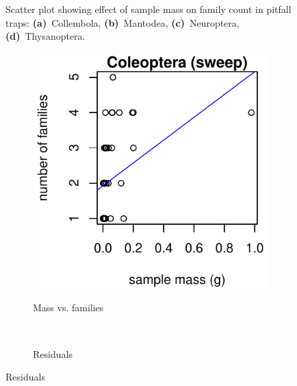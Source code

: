 \documentclass[10pt,letterpaper,twocolumn]{article}
\begin{document}
\begin{figure}[h]
\begin{subfigure}[b]{0.15\textwidth}
		\label{fig:pitfall_thysanoptera_scatter}
	\end{subfigure}
	\caption{Scatter plot showing effect of sample mass on family count in pitfall traps: \textbf{(a)}~Collembola, \textbf{(b)}~Mantodea, \textbf{(c)}~Neuroptera, \textbf{(d)}~Thysanoptera.}
	\label{fig:pitfall_incomplete}
	\smallskip
	\nointerlineskip
	\hrulefill
\end{figure}


\begin{figure}[h]
	\centering
	\begin{subfigure}[b]{0.15\textwidth}
		\caption{Mass vs. families}
		\includegraphics[width=\textwidth]{plots/mass-vs-count/scatter/2015_sweep_Coleoptera_mass-vs-count.pdf}
		\label{fig:sweep_coleoptera_scatter}
	\end{subfigure}
	~
	\begin{subfigure}[b]{0.15\textwidth}
		\caption{Residuals}

\end{subfigure}
\end{figure}
\end{document}
